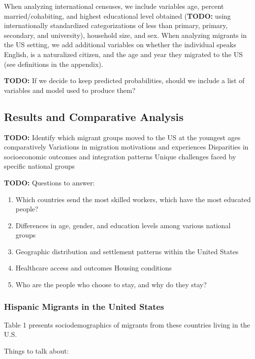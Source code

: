 \documentclass[
]{article}
\begin{document}
When analyzing international censuses, we include variables age, percent
married/cohabiting, and highest educational level obtained
(\textbf{TODO:} using internationally standardized categorizations of
less than primary, primary, secondary, and university), household size,
and sex. When analyzing migrants in the US setting, we add additional
variables on whether the individual speaks English, is a naturalized
citizen, and the age and year they migrated to the US (see definitions
in the appendix).

\textbf{TODO:} If we decide to keep predicted probabilities, should we
include a list of variables and model used to produce them?

\subsection{Results and Comparative Analysis}\label{sec-results}

\textbf{TODO:} Identify which migrant groups moved to the US at the
youngest ages comparatively Variations in migration motivations and
experiences Disparities in socioeconomic outcomes and integration
patterns Unique challenges faced by specific national groups

\textbf{TODO:} Questions to answer:

\begin{enumerate}
\def\labelenumi{\arabic{enumi}.}
\item
  Which countries send the most skilled workers, which have the most
  educated people?
\item
  Differences in age, gender, and education levels among various
  national groups
\item
  Geographic distribution and settlement patterns within the United
  States
\item
  Healthcare access and outcomes Housing conditions
\item
  Who are the people who choose to stay, and why do they stay?
\end{enumerate}

\subsubsection{Hispanic Migrants in the United
States}\label{hispanic-migrants-in-the-united-states}

Table 1 presents sociodemographics of migrants from these countries
living in the U.S.

Things to talk about:
\end{document}

